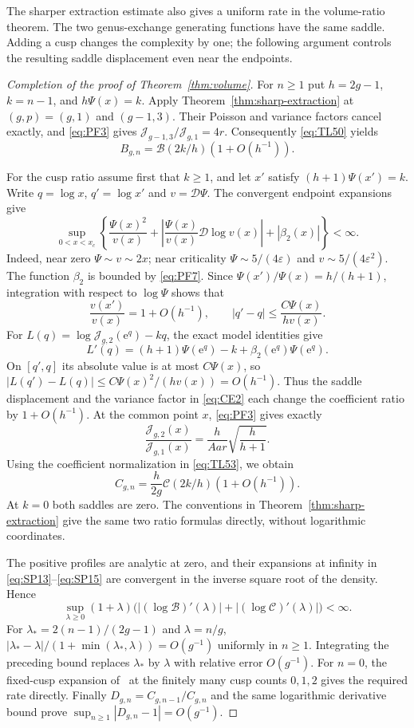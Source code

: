 The sharper extraction estimate also gives a uniform rate in the
volume-ratio theorem. The two genus-exchange generating functions have
the same saddle. Adding a cusp changes the complexity by one; the
following argument controls the resulting saddle displacement even
near the endpoints.

\begin{proof}[Completion of the proof of Theorem~\ref{thm:volume}]
For $n\ge1$ put $h=2g-1$, $k=n-1$, and $h\Psi(x)=k$.
Apply Theorem~\ref{thm:sharp-extraction} at $(g,p)=(g,1)$ and
$(g-1,3)$. Their Poisson and variance factors cancel exactly, and
\eqref{eq:PF3} gives $\mathcal J_{g-1,3}/\mathcal J_{g,1}=4r$.
Consequently \eqref{eq:TL50} yields
\[
 B_{g,n}=\mathcal B(2k/h)(1+O(h^{-1})).
\]

For the cusp ratio assume first that $k\ge1$, and let $x'$ satisfy
$(h+1)\Psi(x')=k$. Write $q=\log x$, $q'=\log x'$ and
$v=\mathscr D\Psi$. The convergent endpoint expansions give
\[
 \sup_{0<x<x_c}\left\{
 \frac{\Psi(x)^2}{v(x)}+
 \left|\frac{\Psi(x)}{v(x)}\mathscr D\log v(x)\right|
 +|\beta_2(x)|\right\}<\infty.
\]
Indeed, near zero $\Psi\sim v\sim2x$; near criticality
$\Psi\sim5/(4\varepsilon)$ and $v\sim5/(4\varepsilon^2)$.
The function $\beta_2$ is bounded by \eqref{eq:PF7}.
Since $\Psi(x')/\Psi(x)=h/(h+1)$, integration with respect to
$\log\Psi$ shows that
\[
 \frac{v(x')}{v(x)}=1+O(h^{-1}),\qquad
 |q'-q|\le\frac{C\Psi(x)}{h v(x)}.
\]
For $L(q)=\log\mathcal J_{g,2}(\mathrm{e}^q)-kq$, the exact model identities give
\[
 L'(q)=(h+1)\Psi(\mathrm{e}^q)-k+\beta_2(\mathrm{e}^q)\Psi(\mathrm{e}^q).
\]
On $[q',q]$ its absolute value is at most $C\Psi(x)$, so
$|L(q')-L(q)|\le C\Psi(x)^2/(hv(x))=O(h^{-1})$.
Thus the saddle displacement and the variance factor in
\eqref{eq:CE2} each change the coefficient ratio by $1+O(h^{-1})$.
At the common point $x$, \eqref{eq:PF3} gives exactly
\[
 \frac{\mathcal J_{g,2}(x)}{\mathcal J_{g,1}(x)}
 =\frac{h}{Aar}\sqrt{\frac{h}{h+1}}.
\]
Using the coefficient normalization in \eqref{eq:TL53}, we obtain
\[
 C_{g,n}=\frac{h}{2g}\mathcal C(2k/h)(1+O(h^{-1})).
\]
At $k=0$ both saddles are zero. The conventions in
Theorem~\ref{thm:sharp-extraction} give the same two ratio formulas
directly, without logarithmic coordinates.

The positive profiles are analytic at zero, and their expansions at
infinity in \eqref{eq:SP13}--\eqref{eq:SP15} are convergent in the
inverse square root of the density. Hence
\[
 \sup_{\lambda\ge0}(1+\lambda)
 \bigl(|(\log\mathcal B)'(\lambda)|+
       |(\log\mathcal C)'(\lambda)|\bigr)<\infty.
\]
For $\lambda_*=2(n-1)/(2g-1)$ and $\lambda=n/g$,
$|\lambda_* -\lambda|/(1+\min(\lambda_*,\lambda))=O(g^{-1})$
uniformly in $n\ge1$. Integrating the preceding bound replaces
$\lambda_*$ by $\lambda$ with relative error $O(g^{-1})$.
For $n=0$, the fixed-cusp expansion of~\cite{MZ} at the finitely
many cusp counts $0,1,2$ gives the required rate directly.
Finally $D_{g,n}=C_{g,n-1}/C_{g,n}$ and the same logarithmic
derivative bound prove $\sup_{n\ge1}|D_{g,n}-1|=O(g^{-1})$.
\end{proof}

